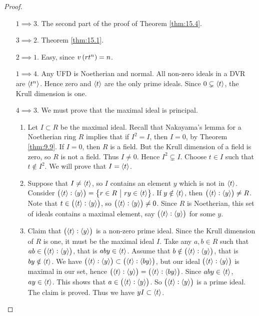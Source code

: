 \begin{proof}
\hfill
\begin{itemize}[leftmargin=0.5in]
\item[$ 1 \implies 3 $.] The second part of the proof of Theorem \ref{thm:15.4}.
\item[$ 3 \implies 2 $.] Theorem \ref{thm:15.1}.
\item[$ 2 \implies 1 $.] Easy, since $ v\br{rt^n} = n $.
\item[$ 1 \implies 4 $.] Any UFD is Noetherian and normal. All non-zero ideals in a DVR are $ \left\langle t^n \right\rangle $. Hence zero and $ \left\langle t \right\rangle $ are the only prime ideals. Since $ 0 \subsetneq \left\langle t \right\rangle $, the Krull dimension is one.
\item[$ 4 \implies 3 $.] We must prove that the maximal ideal is principal.
\begin{enumerate}[leftmargin=0.5in, label=Step \arabic*.]
\item Let $ I \subset R $ be the maximal ideal. Recall that Nakayama's lemma for a Noetherian ring $ R $ implies that if $ I^2 = I $, then $ I = 0 $, by Theorem \ref{thm:9.9}. If $ I = 0 $, then $ R $ is a field. But the Krull dimension of a field is zero, so $ R $ is not a field. Thus $ I \ne 0 $. Hence $ I^2 \subsetneq I $. Choose $ t \in I $ such that $ t \notin I^2 $. We will prove that $ I = \left\langle t \right\rangle $.
\item Suppose that $ I \ne \left\langle t \right\rangle $, so $ I $ contains an element $ y $ which is not in $ \left\langle t \right\rangle $. Consider $ \br{\abr{t} : \abr{y}} = \cbr{r \in R \st ry \in \abr{t}} $. If $ y \notin \left\langle t \right\rangle $, then $ \br{\abr{t} : \abr{y}} \ne R $. Note that $ t \in \br{\abr{t} : \abr{y}} $, so $ \br{\abr{t} : \abr{y}} \ne 0 $. Since $ R $ is Noetherian, this set of ideals contains a maximal element, say $ \br{\abr{t} : \abr{y}} $ for some $ y $.
\item Claim that $ \br{\abr{t} : \abr{y}} $ is a non-zero prime ideal. Since the Krull dimension of $ R $ is one, it must be the maximal ideal $ I $. Take any $ a, b \in R $ such that $ ab \in \br{\abr{t} : \abr{y}} $, that is $ aby \in \left\langle t \right\rangle $. Assume that $ b \notin \br{\abr{t} : \abr{y}} $, that is $ by \notin \left\langle t \right\rangle $. We have $ \br{\abr{t} : \abr{y}} \subset \br{\abr{t} : \abr{by}} $, but our ideal $ \br{\abr{t} : \abr{y}} $ is maximal in our set, hence $ \br{\abr{t} : \abr{y}} = \br{\abr{t} : \abr{by}} $. Since $ aby \in \left\langle t \right\rangle $, $ ay \in \left\langle t \right\rangle $. This shows that $ a \in \br{\abr{t} : \abr{y}} $. So $ \br{\abr{t} : \abr{y}} $ is a prime ideal. The claim is proved. Thus we have $ yI \subset \left\langle t \right\rangle $.


\end{enumerate}
\end{itemize}
\end{proof}
